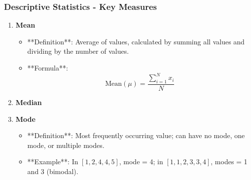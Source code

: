 \documentclass{beamer}
\begin{document}
\begin{frame}[fragile]
    \frametitle{Descriptive Statistics - Key Measures}
    \begin{enumerate}
        \item \textbf{Mean}
            \begin{itemize}
                \item **Definition**: Average of values, calculated by summing all values and dividing by the number of values.
                \item **Formula**: 
                \[
                \text{Mean} (\mu) = \frac{\sum_{i=1}^{N} x_i}{N}
                \]
                \end{itemize}
        \item \textbf{Median}
        \item \textbf{Mode}
            \begin{itemize}
                \item **Definition**: Most frequently occurring value; can have no mode, one mode, or multiple modes.
                \item **Example**: In \( [1, 2, 4, 4, 5] \), mode = 4; in \( [1, 1, 2, 3, 3, 4] \), modes = 1 and 3 (bimodal).
            \end{itemize}
    \end{enumerate}
\end{frame}
\end{document}
